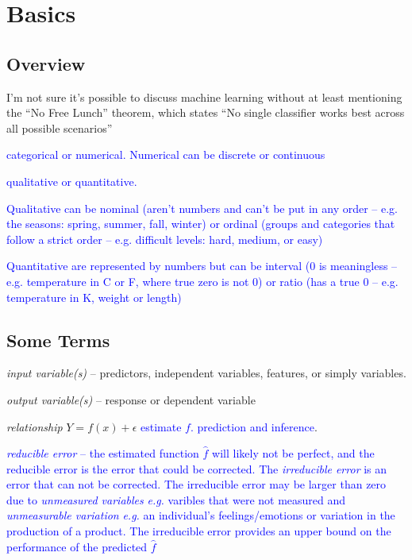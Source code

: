 \chapter{Basics}

\section{Overview}

I'm not sure it's possible to discuss machine learning without at least mentioning the ``No Free Lunch'' theorem, which states ``No single classifier works best across all possible scenarios''

\textcolor{blue}{categorical or numerical. Numerical can be discrete or continuous}

\textcolor{blue}{qualitative or quantitative.} 

\textcolor{blue}{Qualitative can be nominal (aren't numbers and can't be put in any order -- e.g. the seasons: spring, summer, fall, winter) or ordinal (groups and categories that follow a strict order -- e.g. difficult levels: hard, medium, or easy)}

\textcolor{blue}{Quantitative are represented by numbers but can be interval (0 is meaningless -- e.g. temperature in C or F, where true zero is not 0) or ratio (has a true 0 -- e.g. temperature in K, weight or length)}










\section{Some Terms}

\emph{input variable(s)} -- predictors, independent variables, features, or simply variables.

\emph{output variable(s)} -- response or dependent variable

\emph{relationship} $Y = f(x) + \epsilon$ \textcolor{blue}{estimate $f$. prediction and inference}.

\textcolor{blue}{\emph{reducible error} -- the estimated function $\hat{f}$ will likely not be perfect, and the reducible error is the error that could be corrected.  The \emph{irreducible error} is an error that can not be corrected. The irreducible error may be larger than zero due to \emph{unmeasured variables} \emph{e.g.} varibles that were not measured and \emph{unmeasurable variation} \emph{e.g.} an individual's feelings/emotions or variation in the production of a product. The irreducible error provides an upper bound on the performance of the predicted $\hat{f}$}

